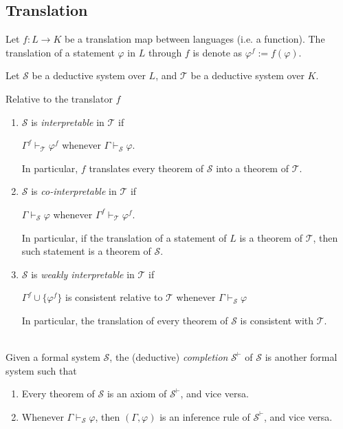 \documentclass{treatise}
\begin{document}
\begin{shaded}
\section{Translation}
\begin{definition}
Let $f: L \to K$ be a translation map between languages (i.e. a function). The translation of a statement $\varphi$ in $L$ through $f$ is denote as $\varphi^f := f(\varphi)$.
\end{definition}
Let $\mathcal{S}$ be a deductive system over $L$, and $\mathcal{T}$ be a deductive system over $K$.
\begin{definition}
Relative to the translator $f$
\begin{enumerate}
    \item $\mathcal{S}$ is \emph{interpretable} in $\mathcal{T}$ if
    \begin{center}
        $\Gamma^f \vdash_{\mathcal{T}} \varphi^f$ whenever $\Gamma \vdash_{\mathcal{S}} \varphi$.
    \end{center}
    In particular, $f$ translates every theorem of $\mathcal{S}$ into a theorem of $\mathcal{T}$.
    \item $\mathcal{S}$ is \emph{co-interpretable} in $\mathcal{T}$ if
    \begin{center}
        $\Gamma \vdash_{\mathcal{S}} \varphi$ whenever $\Gamma^f \vdash_{\mathcal{T}} \varphi^f$.
    \end{center}
    In particular, if the translation of a statement of $L$ is a theorem of $\mathcal{T}$, then such statement is a theorem of $\mathcal{S}$.
    \item $\mathcal{S}$ is \emph{weakly interpretable} in $\mathcal{T}$ if
    \begin{center}
        $\Gamma^f \cup \{ \varphi^f \}$ is consistent relative to $\mathcal{T}$ whenever $\Gamma \vdash_{\mathcal{S}} \varphi$
    \end{center}
    In particular, the translation of every theorem of $\mathcal{S}$ is consistent with $\mathcal{T}$.
\end{enumerate}
\end{definition}
\ \\
Given a formal system $\mathcal{S}$, the (deductive) \emph{completion} $\mathcal{S}^{\vdash}$ of $\mathcal{S}$ is another formal system such that
\begin{enumerate}
    \item Every theorem of $\mathcal{S}$ is an axiom of $\mathcal{S}^{\vdash}$, and vice versa.
    \item Whenever $\Gamma \vdash_{\mathcal{S}} \varphi$, then $(\Gamma, \varphi)$ is an inference rule of $\mathcal{S}^{\vdash}$, and vice versa.

\end{enumerate}
\end{shaded}
\end{document}

